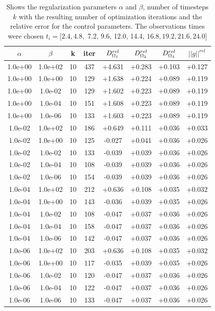 \documentclass[11pt,a4paper]{article}
\begin{document}
\begin{table}
\centering
\caption{Shows the regularization parameters $\alpha$ and $\beta$, number of timesteps $k$ with the resulting number of optimization iterations and the relative error for the control parameters. The observations times were chosen $ t_i=[2.4, 4.8,$ 7.2, 9.6, 12.0, 14.4, $16.8, 19.2, 21.6, 24.0]$ }
\begin{tabular}{*{8}c}
$\alpha$ & $\beta$ & k  & iter & $ D_{\Omega_1}\sp{rel}$ & $ D_{\Omega_2}\sp{rel} $ & $D_{\Omega_3}\sp{rel}$ & $||g||^{rel}$ \\
\hline 
 1.0e+00 	 & 1.0e+02 	 & 10 & 437 	 & +4.631 & +0.283 & +0.103 & +0.127 \\ 
 1.0e+00 	 & 1.0e+00 	 & 10 & 129 	 & +1.638 & +0.224 & +0.089 & +0.119 \\ 
 1.0e+00 	 & 1.0e-02 	 & 10 & 129 	 & +1.602 & +0.223 & +0.089 & +0.119 \\ 
 1.0e+00 	 & 1.0e-04 	 & 10 & 151 	 & +1.608 & +0.223 & +0.089 & +0.119 \\ 
 1.0e+00 	 & 1.0e-06 	 & 10 & 133 	 & +1.603 & +0.223 & +0.089 & +0.119 \\ 
 \hline
 1.0e-02 	 & 1.0e+02 	 & 10 & 186 	 & +0.649 & +0.111 & +0.036 & +0.033 \\ 
 1.0e-02 	 & 1.0e+00 	 & 10 & 125 	 & -0.027 & +0.041 & +0.036 & +0.026 \\ 
 1.0e-02 	 & 1.0e-02 	 & 10 & 133 	 & -0.039 & +0.039 & +0.036 & +0.026 \\ 
 1.0e-02 	 & 1.0e-04 	 & 10 & 108 	 & -0.039 & +0.039 & +0.036 & +0.026 \\ 
 1.0e-02 	 & 1.0e-06 	 & 10 & 154 	 & -0.039 & +0.039 & +0.036 & +0.026 \\ 
 \hline
 1.0e-04 	 & 1.0e+02 	 & 10 & 212 	 & +0.636 & +0.108 & +0.035 & +0.032 \\ 
 1.0e-04 	 & 1.0e+00 	 & 10 & 143 	 & -0.036 & +0.039 & +0.035 & +0.026 \\ 
 1.0e-04 	 & 1.0e-02 	 & 10 & 108 	 & -0.047 & +0.037 & +0.036 & +0.026 \\ 
 1.0e-04 	 & 1.0e-04 	 & 10 & 158 	 & -0.047 & +0.037 & +0.036 & +0.026 \\ 
 1.0e-04 	 & 1.0e-06 	 & 10 & 142 	 & -0.047 & +0.037 & +0.036 & +0.026 \\ 
 \hline
 1.0e-06 	 & 1.0e+02 	 & 10 & 203 	 & +0.636 & +0.108 & +0.035 & +0.032 \\ 
 1.0e-06 	 & 1.0e+00 	 & 10 & 117 	 & -0.035 & +0.039 & +0.035 & +0.026 \\ 
 1.0e-06 	 & 1.0e-02 	 & 10 & 120 	 & -0.047 & +0.037 & +0.036 & +0.026 \\ 
 1.0e-06 	 & 1.0e-04 	 & 10 & 122 	 & -0.047 & +0.037 & +0.036 & +0.026 \\ 
 1.0e-06 	 & 1.0e-06 	 & 10 & 133 	 & -0.047 & +0.037 & +0.036 & +0.026 \\ 

\end{tabular}
\label{Tab::1}
\end{table} 
 
\end{document}
